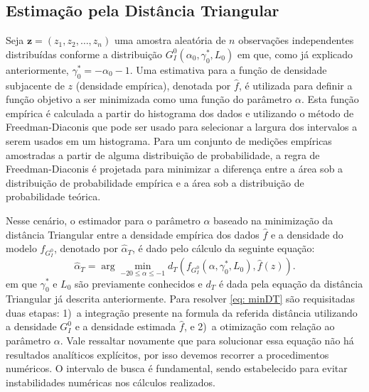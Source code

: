 \subsection{Estimação pela Distância Triangular}

Seja $\bm z = (z_1, z_2, \dots, z_n)$ uma amostra aleatória de $n$ observações independentes distribuídas conforme a distribuição $G_I^0(\alpha_0, \gamma_0^{*}, L_0)$ em que, como já explicado anteriormente, $\gamma_0^{*} = - \alpha_0 - 1$. Uma estimativa para a função de densidade subjacente de $z$ (densidade empírica), denotada por $\widehat{f}$, é utilizada para definir a função objetivo a ser minimizada como uma função do parâmetro $\alpha$. Esta função empírica é calculada a partir do histograma dos dados e utilizando o método de Freedman-Diaconis que pode ser usado para selecionar a largura dos intervalos a serem usados em um histograma. Para um conjunto de medições empíricas amostradas a partir de alguma distribuição de probabilidade, a regra de Freedman-Diaconis \citep{FreedmanDiaconis} é projetada para minimizar a diferença entre a área sob a distribuição de probabilidade empírica e a área sob a distribuição de probabilidade teórica. 

Nesse cenário, o estimador para o parâmetro $\alpha$ baseado na minimização da distância Triangular entre a densidade empírica dos dados $\widehat{f}$ e a densidade do modelo $f_{G_I^0}$, denotado por $\widehat{\alpha}_{T}$, é dado pelo cálculo da seguinte equação:
\begin{equation}
    \widehat{\alpha}_{T} = \arg\min_{-20 \leq \alpha \leq -1} d_T(f_{G_I^0}(\alpha, \gamma_0^{*}, L_0), \widehat{f}(z)) .
    \label{eq: minDT}
\end{equation}
em que $\gamma_0^{*}$ e $L_0$ são previamente conhecidos e $d_T$ é dada pela equação da distância Triangular já descrita anteriormente. 
Para resolver \eqref{eq: minDT} são requisitadas duas etapas: 
1)~a integração presente na formula da referida distância utilizando a densidade $G_I^0$ e a densidade estimada $\widehat{f}$, e 
2)~a otimização com relação ao parâmetro $\alpha$. 
Vale ressaltar novamente que para solucionar essa equação não há resultados analíticos explícitos, por isso devemos recorrer a procedimentos numéricos. 
O intervalo de busca é fundamental, sendo estabelecido para evitar instabilidades numéricas nos cálculos realizados.